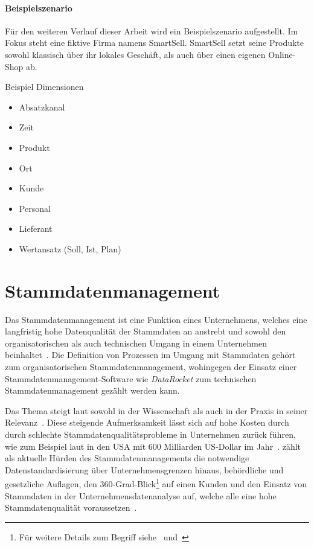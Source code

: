\documentclass[
  language=german, %
  type=bachelor%
]{isthesis}
\begin{document}
\begin{content}
  \paragraph{Beispielszenario}
  Für den weiteren Verlauf dieser Arbeit wird ein Beispielszenario aufgestellt. Im
  Fokus steht eine fiktive Firma namens SmartSell. SmartSell setzt seine
  Produkte sowohl klassisch über ihr lokales Geschäft, als auch über einen
  eigenen Online-Shop ab.

  Beispiel Dimensionen
  \begin{itemize}
    \item Absatzkanal
    \item Zeit
    \item Produkt
    \item Ort
    \item Kunde
    \item Personal
    \item Lieferant
    \item Wertansatz (Soll, Ist, Plan)
  \end{itemize}

  \section{Stammdatenmanagement}
	Das Stammdatenmanagement ist eine Funktion eines Unternehmens, welches eine
	langfristig hohe Datenqualität der Stammdaten an anstrebt und sowohl den
	organisatorischen als auch technischen Umgang in einem Unternehmen
	beinhaltet~\cite[][S.  2]{legner2007stammdaten}.  Die Definition von
	Prozessen im Umgang mit Stammdaten gehört \zB{} zum organisatorischen
	Stammdatenmanagement, wohingegen der Einsatz einer Stammdatenmanagement-Software
	wie \textit{DataRocket} zum technischen Stammdatenmanagement gezählt werden
	kann.  
	
	Das Thema steigt laut \textsc{\citeauthor{otto2012design}} sowohl in der
	Wissenschaft als auch in der Praxis in seiner Relevanz~\cite[][S.
	1]{otto2012design}. Diese steigende Aufmerksamkeit lässt sich auf hohe Kosten
	durch durch schlechte Stammdatenqualitätsprobleme in Unternehmen zurück
	führen, wie zum Beispiel laut \textsc{\citeauthor{eckerson2002data}} in den
	USA mit 600 Milliarden US-Dollar im Jahr~\cite[][S. 3]{eckerson2002data}.
	\citeauthor{otto2011stammdatenmanagement} zählt als aktuelle Hürden des
	Stammdatenmanagements die notwendige Datenstandardisierung über
	Unternehmensgrenzen hinaus, behördliche und gesetzliche Auflagen, den
	360-Grad-Blick\footnote{Für weitere Details zum Begriff
	siehe~\cite{kotorov2003customer} und~\cite{otto2016master}} auf einen Kunden
	und den Einsatz von Stammdaten in der Unternehmensdatenanalyse auf, welche
	alle eine hohe Stammdatenqualität voraussetzen~\cite[][S. 5
	f.]{otto2011stammdatenmanagement}.


\end{content}
\end{document}
